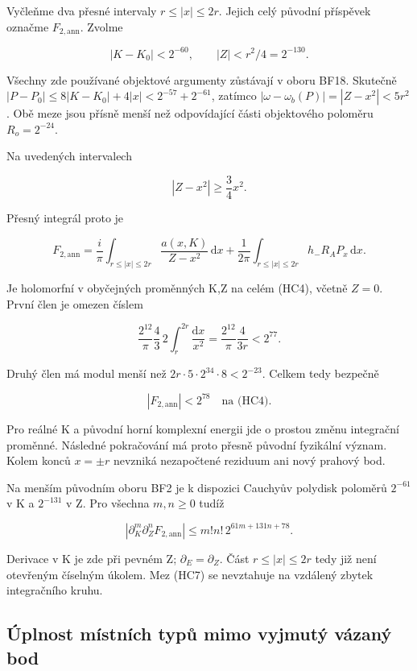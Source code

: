 \documentclass[11pt,a4paper]{article}
\theoremstyle{remark}\newtheorem{remark}[theorem]{Poznámka}
\numberwithin{equation}{section}
\begin{document}
Vyčleňme dva přesné intervaly \(r\le|x|\le2r\). Jejich celý původní
příspěvek označme \(F_{2,\mathrm{ann}}\). Zvolme

\[
|K-K_0|<2^{-60},\qquad |Z|<r^2/4=2^{-130}.
\tag{HC4}
\]

Všechny zde používané objektové argumenty zůstávají v oboru BF18.
Skutečně \(|P-P_0|\le8|K-K_0|+4|x|<2^{-57}+2^{-61}\), zatímco
\(|\omega-\omega_b(P)|=|Z-x^2|<5r^2\). Obě meze jsou přísně menší než
odpovídající části objektového poloměru \(R_o=2^{-24}\).

Na uvedených intervalech

\[
|Z-x^2|\ge\frac34x^2.
\tag{HC5}
\]

Přesný integrál proto je

\[
F_{2,\mathrm{ann}}=
\frac{i}{\pi}\int_{r\le|x|\le2r}\frac{a(x,K)}{Z-x^2}\,\mathrm dx
+\frac1{2\pi}\int_{r\le|x|\le2r}h_-R_AP_x\,\mathrm dx.
\tag{HC6}
\]

Je holomorfní v obyčejných proměnných K,Z na celém (HC4), včetně
\(Z=0\). První člen je omezen číslem

\[
\frac{2^{12}}{\pi}\frac43\,2\int_r^{2r}\frac{\mathrm dx}{x^2}
=\frac{2^{12}}{\pi}\frac4{3r}<2^{77}.
\]

Druhý člen má modul menší než \(2r\cdot5\cdot2^{34}\cdot8<2^{-23}\).
Celkem tedy bezpečně

\[
\boxed{|F_{2,\mathrm{ann}}|<2^{78}\quad\text{na (HC4)}.}
\tag{HC7}
\]

Pro reálné K a původní horní komplexní energii jde o prostou změnu
integrační proměnné. Následné pokračování má proto přesně původní
fyzikální význam. Kolem konců \(x=\pm r\) nevzniká nezapočtené reziduum
ani nový prahový bod.

Na menším původním oboru BF2 je k dispozici Cauchyův polydisk poloměrů
\(2^{-61}\) v K a \(2^{-131}\) v Z. Pro všechna \(m,n\ge0\) tudíž

\[
\boxed{
|\partial_K^m\partial_Z^n F_{2,\mathrm{ann}}|
\le m!n!\,2^{61m+131n+78}.}
\tag{HC8}
\]

Derivace v K je zde při pevném Z; \(\partial_E=\partial_Z\). Část
\(r\le|x|\le2r\) tedy již není otevřeným číselným úkolem. Mez (HC7) se
nevztahuje na vzdálený zbytek integračního kruhu.

\hypertarget{uxfaplnost-muxedstnuxedch-typux16f-mimo-vyjmutuxfd-vuxe1zanuxfd-bod}{%
\subsection{Úplnost místních typů mimo vyjmutý vázaný
bod}\label{uxfaplnost-muxedstnuxedch-typux16f-mimo-vyjmutuxfd-vuxe1zanuxfd-bod}}
\end{document}
